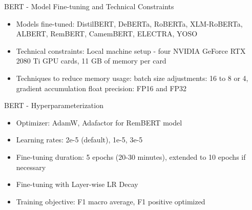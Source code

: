 \documentclass[aspectratio=149]{beamer}
\begin{document}
\begin{frame}{BERT - Model Fine-tuning and Technical Constraints}
    \begin{itemize}
        \item Models fine-tuned: DistilBERT, DeBERTa, RoBERTa, XLM-RoBERTa, ALBERT, RemBERT, CamemBERT, ELECTRA, YOSO
        \item Technical constraints:  Local machine setup - four NVIDIA GeForce RTX 2080 Ti GPU cards, 11 GB of memory per card
        \item Techniques to reduce memory usage: batch size adjustments: 16 to 8 or 4, gradient accumulation float precision: FP16 and FP32
        
        \end{itemize}
\end{frame}



\begin{frame}{BERT - Hyperparameterization}
    \begin{itemize}
        \item Optimizer: AdamW, Adafactor for RemBERT model
        \item Learning rates: 2e-5 (default), 1e-5, 3e-5
        \item Fine-tuning duration: 5 epochs (20-30 minutes), extended to 10 epochs if necessary
        \item Fine-tuning with Layer-wise LR Decay
        \item Training objective: F1 macro average, F1 positive optimized
    \end{itemize}
    
\end{frame}
\end{document}
